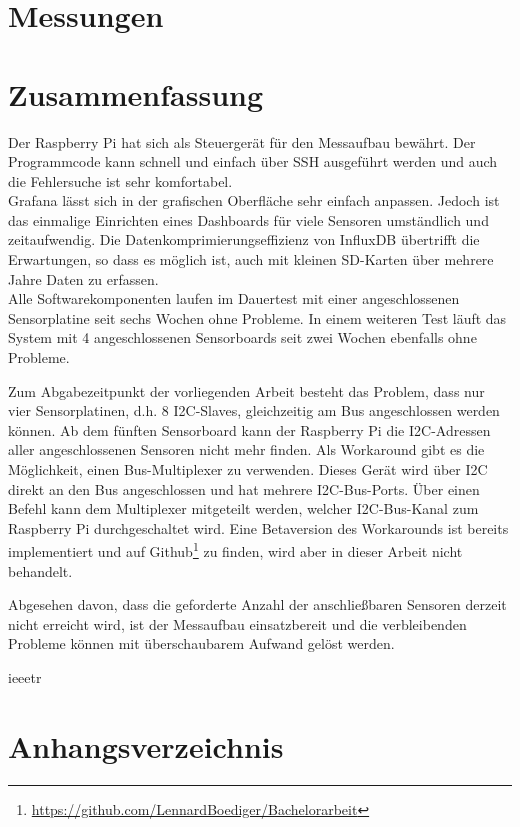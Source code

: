 \documentclass[a4paper,oneside,12pt,titlepage]{scrartcl}   %
\begin{document}
\section{Messungen}

\newpage
\section{Zusammenfassung}
Der Raspberry Pi hat sich als Steuergerät für den Messaufbau bewährt.
Der Programmcode kann schnell und einfach über SSH ausgeführt werden und auch die Fehlersuche ist sehr komfortabel.\\
Grafana lässt sich in der grafischen Oberfläche sehr einfach anpassen. Jedoch ist das einmalige Einrichten eines Dashboards für viele Sensoren umständlich und zeitaufwendig.
Die Datenkomprimierungseffizienz von InfluxDB übertrifft die Erwartungen, so dass es möglich ist, auch mit kleinen SD-Karten über mehrere Jahre Daten zu erfassen.\\
Alle Softwarekomponenten laufen im Dauertest mit einer angeschlossenen Sensorplatine seit sechs Wochen ohne Probleme.
In einem weiteren Test läuft das System mit 4 angeschlossenen Sensorboards seit zwei Wochen ebenfalls ohne Probleme.\smallskip

\noindent Zum Abgabezeitpunkt der vorliegenden Arbeit besteht das Problem, dass nur vier Sensorplatinen, d.h. 8 I2C-Slaves, gleichzeitig am Bus angeschlossen werden können.
Ab dem fünften Sensorboard kann der Raspberry Pi die I2C-Adressen aller angeschlossenen Sensoren nicht mehr finden.
Als Workaround gibt es die Möglichkeit, einen Bus-Multiplexer zu verwenden.
Dieses Gerät wird über I2C direkt an den Bus angeschlossen und hat mehrere I2C-Bus-Ports. Über einen Befehl kann dem Multiplexer mitgeteilt werden, welcher I2C-Bus-Kanal zum Raspberry Pi durchgeschaltet wird.
Eine Betaversion des Workarounds ist bereits implementiert und auf Github\footnote{\url{https://github.com/LennardBoediger/Bachelorarbeit}} zu finden, wird aber in dieser Arbeit nicht behandelt.
\smallskip

\noindent Abgesehen davon, dass die geforderte Anzahl der anschließbaren Sensoren derzeit nicht erreicht wird, ist der Messaufbau einsatzbereit und die verbleibenden Probleme können mit überschaubarem Aufwand gelöst werden.
\newpage

 {ieeetr}
\newpage
\section*{Anhangsverzeichnis}
\end{document}
